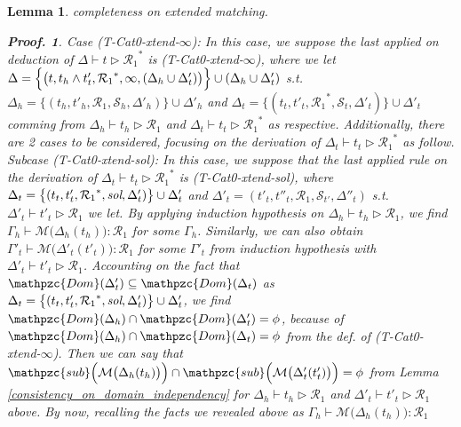 \documentclass[12pt]{article}
\newtheorem{Lemma}{Lemma}[section]
\newtheorem{Proof}{Proof.}
\begin{document}
\begin{Lemma}{completeness on extended matching.}
\begin{Proof}
    Case (T-Cat0-xtend-$\infty$): In this case, we suppose the last applied
    on deduction of $\Delta \vdash t \triangleright {\mathcal{R}_1}^*$ is
    (T-Cat0-xtend-$\infty$), where we let
    $\Delta = \Bigl\{\bigl(t, t_h \wedge t'_t, {\mathcal{R}_1}^*, \infty,
    (\Delta_h \cup \Delta'_t) \bigr) \Bigr\} \cup (\Delta_h \cup \Delta'_t)$
    s.t. $\Delta_h = \bigl\{(t_h, t'_h, \mathcal{R}_1, \mathcal{S}_h,
    \Delta'_h)\bigr\} \cup \Delta'_h$ and
    $\Delta_t = \bigl\{(t_t, t'_t, {\mathcal{R}_1}^*, \mathcal{S}_t,
    \Delta'_t) \bigr\} \cup \Delta'_t$ comming from
    $\Delta_h \vdash t_h \triangleright \mathcal{R}_1$ and
    $\Delta_t \vdash t_t \triangleright {\mathcal{R}_1}^*$ as respective.
    Additionally, there are 2 cases to be considered, focusing on
    the derivation of $\Delta_t \vdash t_t \triangleright {\mathcal{R}_1}^*$
    as follow.
    Subcase (T-Cat0-xtend-sol): In this case, we suppose that
    the last applied rule on the derivation of
    $\Delta_t \vdash t_t \triangleright {\mathcal{R}_1}^*$ is
    (T-Cat0-xtend-sol), where
    $\Delta_t = \bigl\{(t_t, t'_t, {\mathcal{R}_1}^*, \text{\it sol},
    \Delta'_t) \bigr\} \cup \Delta'_t$ and
    $\Delta'_t = (t'_t, t''_t, \mathcal{R}_1, \mathcal{S}_{t'},
    \Delta''_t)$ s.t. $\Delta'_t \vdash t'_t \triangleright \mathcal{R}_1$
    we let. By applying induction hypothesis on
    $\Delta_h \vdash t_h \triangleright \mathcal{R}_1$, we find
    $\Gamma_h \vdash \mathcal{M}\bigl(\Delta_h(t_h) \bigr) : \mathcal{R}_1$
    for some $\Gamma_h$. Similarly, we can also obtain
    $\Gamma'_t \vdash \mathcal{M}\bigl(\Delta'_t(t'_t) \bigr) :
    \mathcal{R}_1$ for some $\Gamma'_t$ from induction hypothesis with
    $\Delta'_t \vdash t'_t \triangleright \mathcal{R}_1$.
    Accounting on the fact that
    $\mathpzc{Dom}(\Delta'_t) \subseteq \mathpzc{Dom}(\Delta_t)$ as
    $\Delta_t = \bigl\{(t_t, t'_t, {\mathcal{R}_1}^*, \text{\it sol},
    \Delta'_t) \bigr\} \cup \Delta'_t$, we find
    $\mathpzc{Dom}(\Delta_h) \cap \mathpzc{Dom}(\Delta'_t) = \phi$, because
    of $\mathpzc{Dom}(\Delta_h) \cap \mathpzc{Dom}(\Delta_t) = \phi$ from
    the def. of (T-Cat0-xtend-$\infty$). Then we can say that
    $\mathpzc{sub}\Bigl(\mathcal{M}\bigl(\Delta_h(t_h) \bigr) \Bigr) \cap
    \mathpzc{sub}\Bigl(\mathcal{M}\bigl(\Delta'_t(t'_t) \bigr) \Bigr) =
    \phi$ from Lemma \ref{consistency_on_domain_independency} for
    $\Delta_h \vdash t_h \triangleright \mathcal{R}_1$ and
    $\Delta'_t \vdash t'_t \triangleright \mathcal{R}_1$ above. By now,
    recalling the facts we revealed above as
    $\Gamma_h \vdash \mathcal{M}\bigl(\Delta_h(t_h) \bigr) : \mathcal{R}_1$

\end{Proof}
\end{Lemma}
\end{document}
